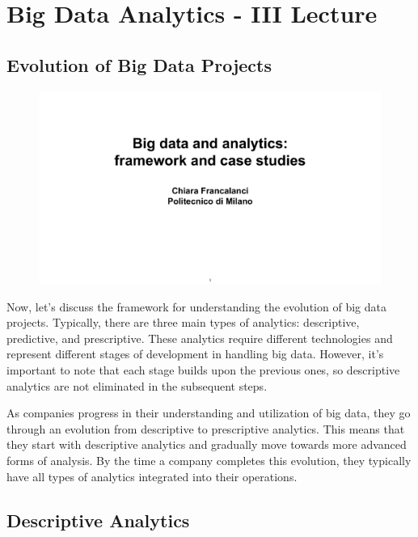 \section{Big Data Analytics - III Lecture}

\subsection{Evolution of Big Data Projects}

\begin{figure}[!h]
    \centering
    \includegraphics[page=38, trim = 3.5cm 1cm 4cm 3.5cm, clip, width=\textwidth]{images/06 - BIG_DATA.pdf}
\end{figure}

Now, let's discuss the framework for
understanding the evolution of big data projects. Typically, there are
three main types of analytics: descriptive, predictive, and
prescriptive. These analytics require different technologies and
represent different stages of development in handling big data. However,
it's important to note that each stage builds upon the previous ones, so
descriptive analytics are not eliminated in the subsequent steps.

As companies progress in their understanding and utilization of big
data, they go through an evolution from descriptive to prescriptive
analytics. This means that they start with descriptive analytics and
gradually move towards more advanced forms of analysis. By the time a
company completes this evolution, they typically have all types of
analytics integrated into their operations.

\subsection{Descriptive Analytics}

